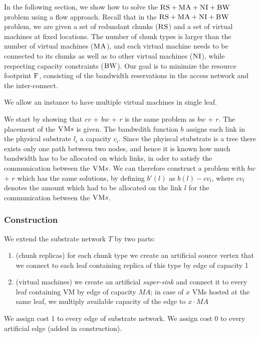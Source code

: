 \documentclass[9pt,twocolumn]{scrartcl}
\newcommand{\VM}{\textsc{VM}}
\newcommand{\CC}{\textsc{NI}}
\newcommand{\RS}{\textsc{RS}}
\newcommand{\BW}{\textsc{BW}}
\newcommand{\MA}{\textsc{MA}}
\newcommand{\Cost}{\textsc{F}}
\begin{document}
In the following section, we show how to solve
the $\RS+\MA+\CC+\BW$ problem using a flow approach.
Recall that in the $\RS+\MA+\CC+\BW$ problem,
we are given a set of redundant chunks ($\RS$) and a set of virtual machines
at fixed locations. The number of chunk types is larger than the number
of virtual machines ($\MA$), and each virtual machine needs to be connected
to its chunks as well as to other virtual machines ($\CC$), while respecting
capacity constraints ($\BW$).
Our goal is to minimize the resource footprint $\Cost$, consisting
of the bandwidth reservations in the access network and the inter-connect.

We allow an instance to have multiple virtual machines in single leaf.

We start by showing that $cv$ + $bw$ + $r$ is the same problem as $bw$ + $r$.
The placement of the $\VM s$ is given. The bandwdith function $b$ assigns
each link in the physical substrate $l_i$ a capacity $c_i$. Since the phyiscal
stubstrate is a tree there exists only one path between two nodes, and hence it
is known how much bandwidth has to be allocated on which links, in oder to
satisfy the communication between the $\VM s$. We can therefore construct a
problem with $bw$ + $r$ which has the same solutions, by defining $b'(l)$ as
$b(l) - cv_l$, where $cv_l$ denotes the amount which had to be allocated on the
link $l$ for the communication between the $\VM s$.


\subsubsection{Construction}



We extend the substrate network $T$ by two parts:
\begin{enumerate}
  \item (chunk replicas) for each chunk type we create an artificial source vertex that we connect to each leaf containing replica of this type by edge of capacity 1
  \item (virtual machines) we create an artificial \emph{super-sink} and connect it to every leaf containing VM by edge of capacity $MA$; in case of $x$ VMs hosted at the same leaf, we multiply available capacity of the edge to $x \cdot MA$
\end{enumerate}

We assign cost 1 to every edge of substrate network. We assign cost 0 to every artificial edge (added in construction).
\end{document}
